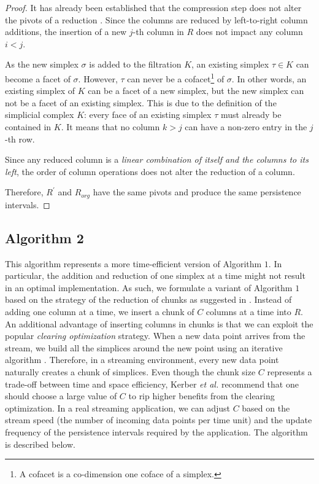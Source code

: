 \documentclass[11pt]{article}
\begin{document}
\begin{proof}
	It has already been established that the compression step does not alter the pivots of a 
	reduction \cite{kerber-18, bauer-14-clear}.  Since the columns are reduced by left-to-right 
	column additions, the insertion of a new $j$-th column in $R$ does not impact any column $i < 
	j$.
	
	As the new simplex $\sigma$ is added to the filtration $K$, an existing simplex $\tau \in K$ 
	can become a facet of $\sigma$.  However, $\tau$ can never be a cofacet\footnote{A cofacet is a 
	co-dimension one coface of a simplex.} of $\sigma$.  In other words, an existing simplex of $K$ 
	can be a facet of a new simplex, but the new simplex can not be a facet of an existing 
	simplex.  This is due to the definition of the simplicial complex $K$: every face of an 
	existing simplex $\tau$ must already be contained in $K$.  It means that no column $k > j$ can 
	have a non-zero entry in the $j$-th row.
	
	
	Since any reduced column is a \emph{linear combination of itself and the columns to its left}, 
	the order of column operations does not alter the reduction of a column.
	
	Therefore, $R^\prime$ 
	and $R_{org}$ have the same pivots and produce the same persistence intervals.
	
	
\end{proof}



\subsection{Algorithm 2}

This algorithm represents a more time-efficient version of Algorithm $1$.  In particular, the 
addition and reduction of one simplex at a time might not result in an optimal implementation.  As 
such, we formulate a variant of Algorithm $1$ based on the strategy of the reduction of 
chunks as suggested in \cite{kerber-18}.  Instead of adding one column at a time, we insert a chunk 
of $C$ columns at a time into $R$.  An additional advantage of inserting columns in chunks is that 
we can exploit the popular \emph{clearing optimization} strategy.  When a new data point arrives 
from the stream, we build all the simplices around the new point using an iterative algorithm 
\cite{zomorodian-10}.  Therefore, in a streaming environment, every new data point naturally 
creates a chunk of simplices.  Even though the chunk size $C$ represents a trade-off between time 
and space efficiency, Kerber \emph{et al.} \cite{kerber-18} recommend that one should choose a 
large value of $C$ to rip higher benefits from the clearing optimization.  In a real streaming 
application, we can adjust $C$ based on the stream speed (the number of incoming data points per 
time unit) and the update frequency of the persistence intervals required by the application.  The 
algorithm is described below.
\end{document}
